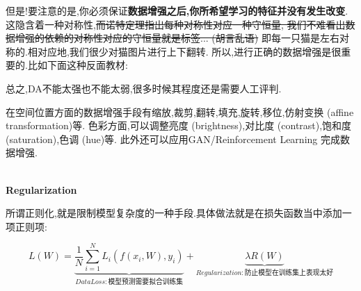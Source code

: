 但是!要注意的是,你必须保证\textbf{数据增强之后,你所希望学习的特征并没有发生改变}.
这隐含着一种对称性,\sout{而诺特定理指出每种对称性对应一种守恒量,
我们不难看出数据增强的依赖的对称性对应的守恒量就是标签... (胡言乱语)}
即每一只猫是左右对称的.相对应地,我们很少对猫图片进行上下翻转.
所以,进行正确的数据增强是很重要的.比如下面这种反面教材:

\begin{figure}[htbp]
	\centering
\end{figure}

总之,DA不能太强也不能太弱,很多时候其程度还是需要人工评判.

在空间位置方面的数据增强手段有缩放,裁剪,翻转,填充,旋转,移位,仿射变换 (affine transformation)等.
色彩方面,可以调整亮度 (brightness),对比度 (contrast),饱和度 (saturation),色调 (hue)等.
此外还可以应用GAN/Reinforcement Learning 完成数据增强.

\textbf{\\Regularization}

所谓正则化,就是限制模型复杂度的一种手段.具体做法就是在损失函数当中添加一项正则项:

\begin{equation}
	L(W) = \underbrace{\frac{1}{N}\sum_{i=1}^{N} L_i(f(x_i, W), y_i) }_{Data Loss:\text{模型预测需要拟合训练集}} + \underbrace{\lambda R(W)}_{Regularization:\text{防止模型在训练集上}\textbf{表现太好}}
\end{equation}

